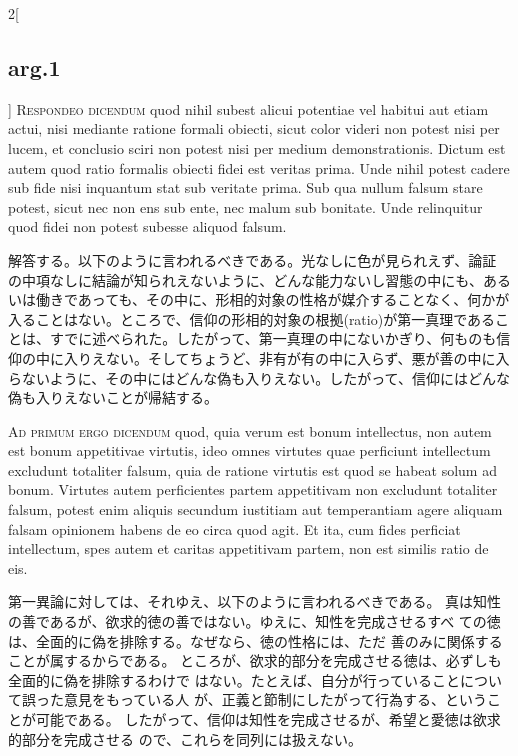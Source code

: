 \documentclass[paper=a4paper,fontsize=10pt,jafontsize=9pt,titlepage]{jlreq}
\begin{document}
\begin{paracol}{2}[\subsection{arg.1}]
{\scshape Respondeo dicendum} quod nihil subest
alicui potentiae vel habitui aut etiam actui, nisi mediante ratione
formali obiecti, sicut color videri non potest nisi per lucem, et
conclusio sciri non potest nisi per medium demonstrationis. Dictum est
autem quod ratio formalis obiecti fidei est veritas prima. Unde nihil
potest cadere sub fide nisi inquantum stat sub veritate prima. Sub qua
nullum falsum stare potest, sicut nec non ens sub ente, nec malum sub
bonitate. Unde relinquitur quod fidei non potest subesse aliquod falsum.

\switchcolumn

解答する。以下のように言われるべきである。光なしに色が見られえず、論証
の中項なしに結論が知られえないように、どんな能力ないし習態の中にも、ある
いは働きであっても、その中に、形相的対象の性格が媒介することなく、何かが
入ることはない。ところで、信仰の形相的対象の根拠(ratio)が第一真理であるこ
とは、すでに述べられた。したがって、第一真理の中にないかぎり、何ものも信
仰の中に入りえない。そしてちょうど、非有が有の中に入らず、悪が善の中に入
らないように、その中にはどんな偽も入りえない。したがって、信仰にはどんな
偽も入りえないことが帰結する。

\switchcolumn*[\subsection{ad.1}]

{\scshape Ad primum ergo dicendum} quod, quia verum
est bonum intellectus, non autem est bonum appetitivae virtutis, ideo
omnes virtutes quae perficiunt intellectum excludunt totaliter falsum,
quia de ratione virtutis est quod se habeat solum ad bonum. Virtutes
autem perficientes partem appetitivam non excludunt totaliter falsum,
potest enim aliquis secundum iustitiam aut temperantiam agere aliquam
falsam opinionem habens de eo circa quod agit. 
Et ita, cum fides
perficiat intellectum, spes autem et caritas appetitivam partem, non est
similis ratio de eis.

\switchcolumn

第一異論に対しては、それゆえ、以下のように言われるべきである。
真は知性の善であるが、欲求的徳の善ではない。ゆえに、知性を完成させるすべ
 ての徳は、全面的に偽を排除する。なぜなら、徳の性格には、ただ
 善のみに関係することが属するからである。
ところが、欲求的部分を完成させる徳は、必ずしも全面的に偽を排除するわけで
 はない。たとえば、自分が行っていることについて誤った意見をもっている人
 が、正義と節制にしたがって行為する、ということが可能である。
したがって、信仰は知性を完成させるが、希望と愛徳は欲求的部分を完成させる
 ので、これらを同列には扱えない。


\end{paracol}
\end{document}
